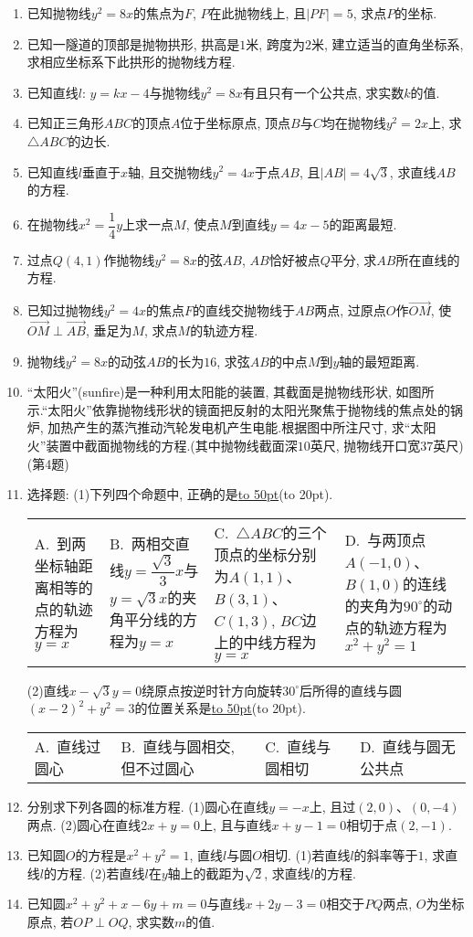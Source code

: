 \documentclass[10pt,a4paper]{article}
\newcommand{\blank}[1]{\underline{\hbox to #1pt{}}}
\newcommand{\bracket}[1]{(\hbox to #1pt{})}
\newcommand{\fourch}[4]{\par\begin{tabular}{p{.23\textwidth}p{.23\textwidth}p{.23\textwidth}p{.23\textwidth}}
A.~#1 &B.~#2& C.~#3& D.~#4
\end{tabular}}
\begin{document}
\begin{enumerate}[1.]
\item 已知抛物线$y^2=8x$的焦点为$F$, $P$在此抛物线上, 且$|PF|=5$, 求点$P$的坐标.
\item 已知一隧道的顶部是抛物拱形, 拱高是$1$米, 跨度为$2$米, 建立适当的直角坐标系, 求相应坐标系下此拱形的抛物线方程.
\item 已知直线$l$: $y=kx-4$与抛物线$y^2=8x$有且只有一个公共点, 求实数$k$的值.
\item 已知正三角形$ABC$的顶点$A$位于坐标原点, 顶点$B$与$C$均在抛物线$y^2=2x$上, 求$\triangle ABC$的边长.
\item 已知直线$l$垂直于$x$轴, 且交抛物线$y^2=4x$于点$AB$, 且$|AB|=4\sqrt 3$, 求直线$AB$的方程.
\item 在抛物线$x^2=\dfrac 14y$上求一点$M$, 使点$M$到直线$y=4x-5$的距离最短.
\item 过点$Q(4,1)$作抛物线$y^2=8x$的弦$AB$, $AB$恰好被点$Q$平分, 求$AB$所在直线的方程.
\item 已知过抛物线$y^2=4x$的焦点$F$的直线交抛物线于$AB$两点, 过原点$O$作$\overrightarrow {OM}$, 使$\overrightarrow {OM}\perp \overrightarrow {AB}$, 垂足为$M$, 求点$M$的轨迹方程.
\item 抛物线$y^2=8x$的动弦$AB$的长为$16$, 求弦$AB$的中点$M$到$y$轴的最短距离.
\item ``太阳火''(sunfire)是一种利用太阳能的装置, 其截面是抛物线形状, 如图所示.``太阳火''依靠抛物线形状的镜面把反射的太阳光聚焦于抛物线的焦点处的锅炉, 加热产生的蒸汽推动汽轮发电机产生电能.根据图中所注尺寸, 求``太阳火''装置中截面抛物线的方程.(其中抛物线截面深$10$英尺, 抛物线开口宽$37$英尺)
(第4题)
\item 选择题:
(1)下列四个命题中, 正确的是\blank{50}\bracket{20}.
\fourch{到两坐标轴距离相等的点的轨迹方程为$y=x$}{两相交直线$y=\dfrac{\sqrt 3}3x$与$y=\sqrt 3x$的夹角平分线的方程为$y=x$}{$\triangle ABC$的三个顶点的坐标分别为$A(1,1)$、$B(3,1)$、$C(1,3)$, $BC$边上的中线方程为$y=x$}{与两顶点$A(-1,0)$、$B(1,0)$的连线的夹角为$90^{\circ }$的动点的轨迹方程为$x^2+y^2=1$}
(2)直线$x-\sqrt 3y=0$绕原点按逆时针方向旋转$30^{\circ }$后所得的直线与圆$(x-2)^2+y^2=3$的位置关系是\blank{50}\bracket{20}.
\fourch{直线过圆心}{直线与圆相交, 但不过圆心}{直线与圆相切}{直线与圆无公共点}
\item 分别求下列各圆的标准方程.
(1)圆心在直线$y=-x$上, 且过$(2,0)$、$(0,-4)$两点.
(2)圆心在直线$2x+y=0$上, 且与直线$x+y-1=0$相切于点$(2,-1)$.
\item 已知圆$O$的方程是$x^2+y^2=1$, 直线$l$与圆$O$相切.
(1)若直线$l$的斜率等于$1$, 求直线$l$的方程.
(2)若直线$l$在$y$轴上的截距为$\sqrt 2$, 求直线$l$的方程.
\item 已知圆$x^2+y^2+x-6y+m=0$与直线$x+2y-3=0$相交于$PQ$两点, $O$为坐标原点, 若$OP\perp OQ$, 求实数$m$的值.

\end{enumerate}
\end{document}
